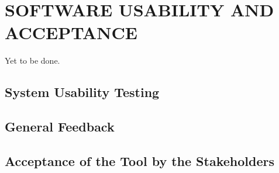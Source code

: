 \section{SOFTWARE USABILITY AND ACCEPTANCE}\label{sec:software-usability-and-acceptance}
Yet to be done.
\subsection{System Usability Testing}\label{subsec:system-usability-testing}
\subsection{General Feedback}\label{subsec:general-feedback}
\subsection{Acceptance of the Tool by the Stakeholders}\label{subsec:acceptance-of-the-tool-by-the-nrf}
